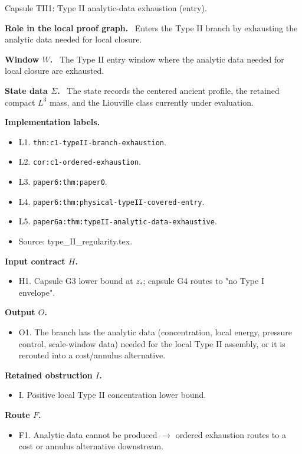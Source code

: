 \documentclass[11pt]{amsart}
\newcommand{\capsulefield}[1]{\par\smallskip\noindent\textbf{#1.}\ }
\begin{document}
\begin{proofcapsule}{Capsule TII1: Type II analytic-data exhaustion (entry).}
  \capsulefield{Role in the local proof graph}
  Enters the Type II branch by exhausting the analytic data needed for local closure.

  \capsulefield{Window \(W\)}
The Type II entry window where the analytic data needed for local closure are exhausted.

  \capsulefield{State data \(\Sigma\)}
The state records the centered ancient profile, the retained compact $L^3$ mass, and the Liouville class currently under evaluation.

  \capsulefield{Implementation labels}
  \begin{itemize}[leftmargin=1.8em]
  \item L1. \texttt{thm:c1-typeII-branch-exhaustion}.
  \item L2. \texttt{cor:c1-ordered-exhaustion}.
  \item L3. \texttt{paper6:thm:paper0}.
  \item L4. \texttt{paper6:thm:physical-typeII-covered-entry}.
  \item L5. \texttt{paper6a:thm:typeII-analytic-data-exhaustive}.
  \item Source: type\_II\_regularity.tex.
  \end{itemize}

  \capsulefield{Input contract \(H\)}
  \begin{itemize}[leftmargin=1.8em]
  \item H1. Capsule G3 lower bound at $z_*$; capsule G4 routes to "no Type I envelope".
  \end{itemize}

  \capsulefield{Output \(O\)}
  \begin{itemize}[leftmargin=1.8em]
  \item O1. The branch has the analytic data (concentration, local energy, pressure control, scale-window data) needed for the local Type II assembly, or it is rerouted into a cost/annulus alternative.
  \end{itemize}

  \capsulefield{Retained obstruction \(I\)}
  \begin{itemize}[leftmargin=1.8em]
  \item I. Positive local Type II concentration lower bound.
  \end{itemize}

  \capsulefield{Route \(F\)}
  \begin{itemize}[leftmargin=1.8em]
  \item F1. Analytic data cannot be produced $\to$ ordered exhaustion routes to a cost or annulus alternative downstream.
  \end{itemize}


\end{proofcapsule}
\end{document}
